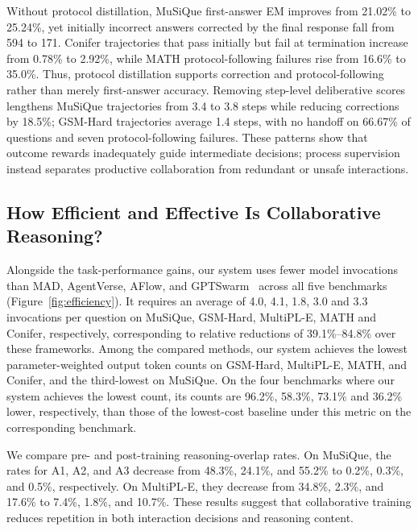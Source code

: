 \documentclass{article} %
\begin{document}

\FloatBarrier

Without protocol distillation, MuSiQue first-answer EM improves from 21.02\% to 25.24\%, yet initially incorrect answers corrected by the final response fall from 594 to 171. Conifer trajectories that pass initially but fail at termination increase from 0.78\% to 2.92\%, while MATH protocol-following failures rise from 16.6\% to 35.0\%. Thus, protocol distillation supports correction and protocol-following rather than merely first-answer accuracy. Removing step-level deliberative scores lengthens MuSiQue trajectories from 3.4 to 3.8 steps while reducing corrections by 18.5\%; GSM-Hard trajectories average 1.4 steps, with no handoff on 66.67\% of questions and seven protocol-following failures. These patterns show that outcome rewards inadequately guide intermediate decisions; process supervision instead separates productive collaboration from redundant or unsafe interactions.


\subsection{How Efficient and Effective Is Collaborative Reasoning?}
\label{sec:efficiency}

Alongside the task-performance gains, our system uses fewer model invocations than MAD, AgentVerse, AFlow, and GPTSwarm~\citep{du2024debate,chen2024agentverse,zhang2025aflow,zhuge2024gptswarm} across all five benchmarks (Figure~\ref{fig:efficiency}). It requires an average of 4.0, 4.1, 1.8, 3.0 and 3.3 invocations per question on MuSiQue, GSM-Hard, MultiPL-E, MATH and Conifer, respectively, corresponding to relative reductions of 39.1\%--84.8\% over these frameworks. Among the compared methods, our system achieves the lowest parameter-weighted output token counts on GSM-Hard, MultiPL-E, MATH, and Conifer, and the third-lowest on MuSiQue. On the four benchmarks where our system achieves the lowest count, its counts are 96.2\%, 58.3\%, 73.1\% and 36.2\% lower, respectively, than those of the lowest-cost baseline under this metric on the corresponding benchmark.

We compare pre- and post-training reasoning-overlap rates. On MuSiQue, the rates for A1, A2, and A3 decrease from 48.3\%, 24.1\%, and 55.2\% to 0.2\%, 0.3\%, and 0.5\%, respectively. On MultiPL-E, they decrease from 34.8\%, 2.3\%, and 17.6\% to 7.4\%, 1.8\%, and 10.7\%. These results suggest that collaborative training reduces repetition in both interaction decisions and reasoning content.
\end{document}

